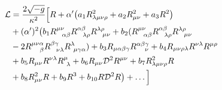 \begin{equation}\begin{split}
{\cal L} &= \frac{2\sqrt{-g}}{\kappa^2}\Big[R + \alpha'\big
(a_1 R_{\lambda\mu\nu\rho}^2 + a_2R_{\mu\nu}^2
+a_3R^2\big)\\&
+(\alpha')^2\big(b_1 R^{\mu\nu}_{\ \  \alpha\beta}
R^{\alpha\beta}_{\ \  \lambda\rho}
R^{\lambda\rho}_{\ \  \mu\nu}+b_2(R^{\mu\nu}_{\ \  \alpha\beta}
R^{\alpha\beta}_{\ \  \lambda\rho}
R^{\lambda\rho}_{\ \  \mu\nu}\\&-2R^{\mu\nu\alpha}_{\ \ \ \beta}
R_{\ \ \nu\lambda}^{\beta\gamma}
R^{\lambda}_{\ \mu \gamma\alpha}) + b_3 R_{\mu\alpha\beta\gamma}
R^{\alpha\beta\gamma}_{\ \ \ \nu} + b_4 R_{\mu\nu\rho\lambda}R^{\nu\lambda}R^{\mu\rho}\\&+b_5R_{\mu\nu}R^{\nu\lambda}R^\mu_{\ \lambda}
+b_6R_{\mu\nu}{\cal D}^2R^{\mu\nu}+b_7R^2_{\lambda\mu\nu\rho}R
\\&+b_8R_{\mu\nu}^2R+b_9R^3+b_{10}R{\cal D}^2R\big)+\ldots\Big]
\end{split}\end{equation}

